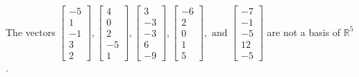 \begin{exercise}
\begin{exerciseStatement}
  \end{exerciseStatement}
  \begin{exerciseAnswer}
   The vectors \(\left[\begin{array}{r}
-5 \\
1 \\
-1 \\
3 \\
2
\end{array}\right] , \left[\begin{array}{r}
4 \\
0 \\
2 \\
-5 \\
1
\end{array}\right] , \left[\begin{array}{r}
3 \\
-3 \\
-3 \\
6 \\
-9
\end{array}\right] , \left[\begin{array}{r}
-6 \\
2 \\
0 \\
1 \\
5
\end{array}\right] , \text{ and } \left[\begin{array}{r}
-7 \\
-1 \\
-5 \\
12 \\
-5
\end{array}\right]\) 
  	 are not  a basis of \(\mathbb{R}^5\).
  


  \end{exerciseAnswer}
\end{exercise}